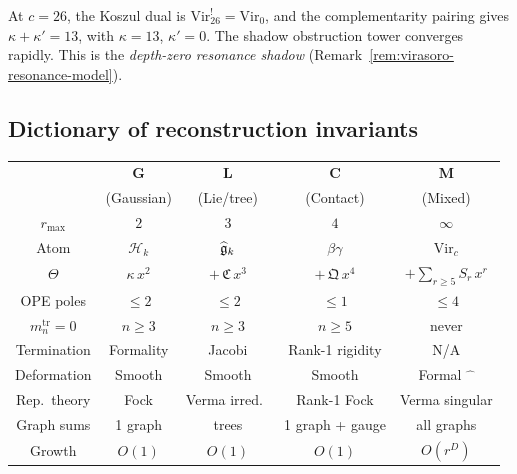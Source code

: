 \begin{remark}
\label{rem:bosonic-string-convergent}
At $c = 26$, the Koszul dual is
$\mathrm{Vir}_{26}^! = \mathrm{Vir}_0$, and the
complementarity pairing gives
$\kappa + \kappa' = 13$, with $\kappa = 13$, $\kappa' = 0$.
The shadow obstruction tower converges rapidly.
This is the \emph{depth-zero resonance shadow}
(Remark~\ref{rem:virasoro-resonance-model}).
\end{remark}


\subsection{Dictionary of reconstruction invariants}
\label{subsec:reconstruction-dictionary}

\begin{center}
\renewcommand{\arraystretch}{1.5}
\small
\begin{tabular}{ccccc}
\toprule
& \textbf{G} & \textbf{L} & \textbf{C} & \textbf{M} \\
& (Gaussian) & (Lie/tree) & (Contact) & (Mixed) \\
\midrule
$r_{\max}$ & $2$ & $3$ & $4$ & $\infty$ \\
Atom & $\mathcal{H}_k$ & $\widehat{\mathfrak{g}}_k$
 & $\beta\gamma$ & $\mathrm{Vir}_c$ \\
$\Theta$ & $\kappa\,x^2$ & $+\,\mathfrak{C}\,x^3$
 & $+\,\mathfrak{Q}\,x^4$ & $+\sum_{r \geq 5} S_r\,x^r$ \\
\midrule
OPE poles & $\leq 2$ & $\leq 2$ & $\leq 1$ & $\leq 4$ \\
$m_n^{\mathrm{tr}} = 0$ & $n \geq 3$ & $n \geq 3$
 & $n \geq 5$ & never \\
Termination & Formality & Jacobi & Rank-1 rigidity
 & N/A \\
\midrule
Deformation & Smooth & Smooth & Smooth & Formal $\widehat{\phantom{x}}$ \\
Rep.\ theory & Fock & Verma irred.\ & Rank-1 Fock
 & Verma singular \\
Graph sums & 1 graph & trees & 1 graph + gauge
 & all graphs \\
Growth & $O(1)$ & $O(1)$ & $O(1)$
 & $O(r^D)$ \\
\bottomrule
\end{tabular}
\end{center}

